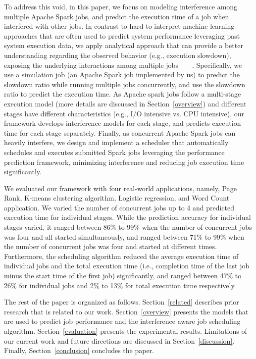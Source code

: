 \noindent
To address this void, in this paper, we focus on modeling interference among multiple Apache Spark jobs, and predict the execution time of a job when interfered with other jobs.
In contrast to hard to interpret machine learning approaches that are often used to predict system performance leveraging past system execution data, we apply analytical approach that can provide a better understanding regarding the observed behavior (e.g., execution slowdown), exposing the underlying interactions among multiple jobs~\cite{ousterhout2015making}~\cite{noorshams2014automated}~\cite{zhu2012performance}~\cite{lai2014io}. Specifically, we use a simulation job (an Apache Spark job implemented by us) to predict the slowdown ratio while running multiple jobs concurrently, and use the slowdown ratio to predict the execution time. As Apache spark jobs follow a multi-stage execution model (more details are discussed in Section~\ref{overview}) and different stages have different characteristics (e.g., I/O intensive vs. CPU intensive), our framework develops interference models for each stage, and predicts execution time for each stage separately. Finally, as concurrent Apache Spark jobs can heavily interfere, we design and implement a scheduler that automatically schedules and executes submitted Spark jobs leveraging the performance prediction framework, minimizing interference and reducing job execution time significantly. 



\noindent
We evaluated our framework with four real-world applications, namely, Page Rank, K-means clustering algorithm, Logistic regression, and Word Count application. We varied the number of concurrent jobs up to 4 and predicted execution time for individual stages. While the prediction accuracy for individual stages varied, it ranged between 86\% to 99\% when the number of concurrent jobs was four and all started simultaneously, and ranged between 71\% to 99\% when the number of concurrent jobs was four and started at different times. Furthermore, the scheduling algorithm reduced the average execution time of individual jobs and the total execution time (i.e., completion time of the last job minus the start time of the first job) significantly, and ranged between 47\% to 26\% for individual jobs and 2\% to 13\% for total execution time respectively.

\noindent
The rest of the paper is organized as follows. Section~\ref{related} describes prior research that is related to our work. Section~\ref{overview} presents the models that are used to predict job performance and the interference aware job scheduling algorithm. Section~\ref{evaluation} presents the experimental results. Limitations of our current work and future directions are discussed in Section~\ref{discussion}. Finally, Section~\ref{conclusion} concludes the paper.



